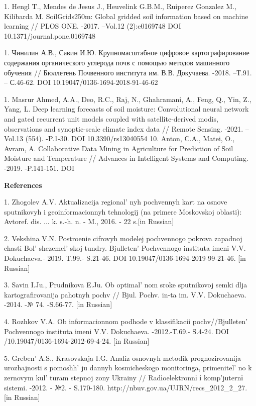 1. Hengl T., Mendes de Jesus J., Heuvelink G.B.M., Ruiperez Gonzalez M.,
Kilibarda M. SoilGrids250m: Global gridded soil information based on
machine learning // PLOS ONE. -2017. --Vol.12 (2):e0169748 DOI
10.1371/journal.pone.0169748

1. Чинилин А.В., Савин И.Ю. Крупномасштабное цифровое картографирование
содержания органического углерода почв с помощью методов машинного
обучения // Бюллетень Почвенного института им. В.В. Докучаева. -2018.
--Т.91. -- С.46-62. DOI 10.19047/0136-1694-2018-91-46-62

1. Masrur Ahmed, A.A., Deo, R.C., Raj, N., Ghahramani, A., Feng, Q., Yin,
Z., Yang, L. Deep learning forecasts of soil moisture: Convolutional
neural network and gated recurrent unit models coupled with
satellite-derived modis, observations and synoptic-scale climate index
data // Remote Sensing. -2021. --Vol.13 (554). -P.1-30. DOI
10.3390/rs13040554
10. Anton, C.A., Matei, O., Avram, A. Collaborative Data Mining in
Agriculture for Prediction of Soil Moisture and Temperature // Advances
in Intelligent Systems and Computing. -2019. -P.141-151. DOI


{\bfseries References}

1. Zhogolev A.V. Aktualizacija regional' nyh pochvennyh
kart na osnove sputnikovyh i geoinformacionnyh tehnologij (na primere
Moskovskoj oblasti): Avtoref. dis. ... k. s.-h. n. - M., 2016. - 22
s.{[}in Russian{]}

2. Vekshina V.N. Postroenie cifrovyh modelej pochvennogo pokrova zapadnoj
chasti Bol' shezemel' skoj tundry.
Bjulleten'{} Pochvennogo instituta imeni V.V.
Dokuchaeva.- 2019. T.99.- S.21-46. DOI 10.19047/0136-1694-2019-99-21-46.
{[}in Russian{]}

3. Savin I.Ju., Prudnikova E.Ju. Ob optimal' nom sroke
sputnikovoj semki dlja kartografirovanija pahotnyh pochv // Bjul. Pochv.
in-ta im. V.V. Dokuchaeva. -2014. -№ 74. -S.66-77. {[}in Russian{]}

4. Rozhkov V.A. Ob informacionnom podhode v klassifikacii
pochv//Bjulleten'{} Pochvennogo instituta imeni V.V.
Dokuchaeva. -2012.-Т.69.- S.4-24. DOI /10.19047/0136-1694-2012-69-4-24.
{[}in Russian{]}

5. Greben'{} A.S., Krasovskaja I.G. Analiz osnovnyh
metodik prognozirovanija urozhajnosti s pomoshh' ju
dannyh kosmicheskogo monitoringa, primenitel' no k
zernovym kul' turam stepnoj zony Ukrainy //
Radіoelektronnі і komp'juternі sistemi. -2012. - №2. - S.170-180.
http://nbuv.gov.ua/UJRN/recs\_2012\_2\_27. {[}in Russian{]}


